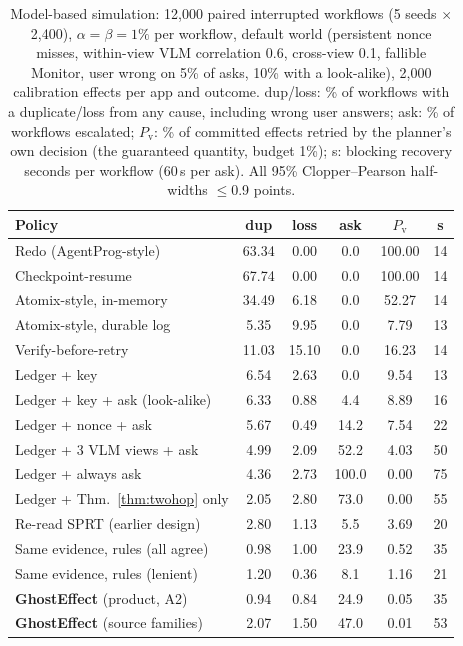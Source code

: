 \begin{table}[t]
\centering
\caption{Model-based simulation: 12{,}000 paired interrupted workflows (5 seeds $\times$ 2{,}400), $\alpha{=}\beta{=}1\%$ per workflow, default
world (persistent nonce misses, within-view VLM correlation 0.6, cross-view 0.1, fallible Monitor, user wrong on 5\% of asks, 10\% with a look-alike), 2{,}000
calibration effects per app and outcome. dup/loss: \% of workflows with a duplicate/loss from any cause, including wrong user answers; ask: \% of workflows escalated;
$P_{\mathrm{v}}$: \% of committed effects retried by the planner's own decision (the guaranteed quantity, budget 1\%); s: blocking recovery
seconds per workflow (60\,s per ask). All 95\% Clopper--Pearson half-widths $\le$0.9 points.}
\label{tab:planner}
\footnotesize
\setlength{\tabcolsep}{2.2pt}
\begin{tabular}{@{}l ccccc@{}}
\toprule
Policy & dup & loss & ask & $P_{\mathrm{v}}$ & s \\
\midrule
Redo (AgentProg-style) & 63.34 & 0.00 & 0.0 & 100.00 & 14 \\
Checkpoint-resume & 67.74 & 0.00 & 0.0 & 100.00 & 14 \\
Atomix-style, in-memory & 34.49 & 6.18 & 0.0 & 52.27 & 14 \\
Atomix-style, durable log & 5.35 & 9.95 & 0.0 & 7.79 & 13 \\
Verify-before-retry & 11.03 & 15.10 & 0.0 & 16.23 & 14 \\
Ledger + key & 6.54 & 2.63 & 0.0 & 9.54 & 13 \\
Ledger + key + ask (look-alike) & 6.33 & 0.88 & 4.4 & 8.89 & 16 \\
Ledger + nonce + ask & 5.67 & 0.49 & 14.2 & 7.54 & 22 \\
Ledger + 3 VLM views + ask & 4.99 & 2.09 & 52.2 & 4.03 & 50 \\
Ledger + always ask & 4.36 & 2.73 & 100.0 & 0.00 & 75 \\
Ledger + Thm.~\ref{thm:twohop} only & 2.05 & 2.80 & 73.0 & 0.00 & 55 \\
Re-read SPRT (earlier design) & 2.80 & 1.13 & 5.5 & 3.69 & 20 \\
\midrule
Same evidence, rules (all agree) & 0.98 & 1.00 & 23.9 & 0.52 & 35 \\
Same evidence, rules (lenient) & 1.20 & 0.36 & 8.1 & 1.16 & 21 \\
\textbf{GhostEffect} (product, A2) & 0.94 & 0.84 & 24.9 & 0.05 & 35 \\
\textbf{GhostEffect} (source families) & 2.07 & 1.50 & 47.0 & 0.01 & 53 \\

\end{tabular}
\end{table}
